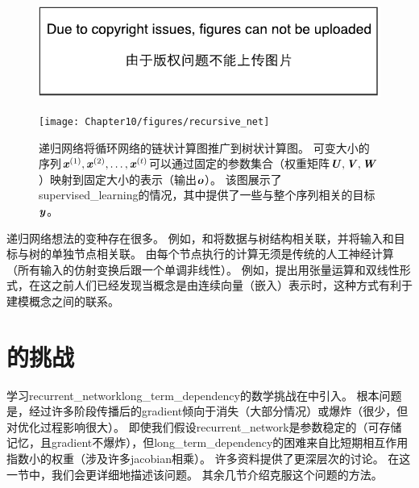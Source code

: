
\begin{figure}[!htb]
\ifOpenSource
\centerline{\includegraphics{figure.pdf}}
\else
\centerline{\texttt{[image: Chapter10/figures/recursive\_net]}}
\fi
\caption{递归网络将循环网络的链状计算图推广到树状计算图。
可变大小的序列$\boldsymbol{\mathit{x}}^{(1)},\boldsymbol{\mathit{x}}^{(2)},\dots,\boldsymbol{\mathit{x}}^{(t)}$可以通过固定的参数集合（权重矩阵$\boldsymbol{\mathit{U}},\boldsymbol{\mathit{V}},\boldsymbol{\mathit{W}}$）映射到固定大小的表示（输出$\boldsymbol{\mathit{o}}$）。
该图展示了\gls{supervised_learning}的情况，其中提供了一些与整个序列相关的目标$\boldsymbol{\mathit{y}}$。
}
\label{fig:chap10_recursive_net}
\end{figure}

递归网络想法的变种存在很多。
例如，\cite{Frasconi97}和\cite{Frasconi-1998}将数据与树结构相关联，并将输入和目标与树的单独节点相关联。
由每个节点执行的计算无须是传统的人工神经计算（所有输入的仿射变换后跟一个单调非线性）。
例如，\cite{Socher-et-al-EMNLP2013}提出用张量运算和双线性形式，在这之前人们已经发现当概念是由连续向量（嵌入）表示时，这种方式有利于建模概念之间的联系\citep{Weston+Bengio+Usunier-2010,Bordes-et-al-AISTATS2012-small}。

\section{的挑战}
\label{sec:the_challenge_of_long_term_dependencies}
学习\gls{recurrent_network}\gls{long_term_dependency}的数学挑战在中引入。
根本问题是，经过许多阶段传播后的\gls{gradient}倾向于消失（大部分情况）或爆炸（很少，但对优化过程影响很大）。
即使我们假设\gls{recurrent_network}是参数稳定的（可存储记忆，且\gls{gradient}不爆炸），但\gls{long_term_dependency}的困难来自比短期相互作用指数小的权重（涉及许多\gls{jacobian}相乘）。
许多资料提供了更深层次的讨论\citep{Hochreiter91-small,Doya93,Bengio1994ITNN,Pascanu+al-ICML2013-small}。
在这一节中，我们会更详细地描述该问题。
其余几节介绍克服这个问题的方法。


